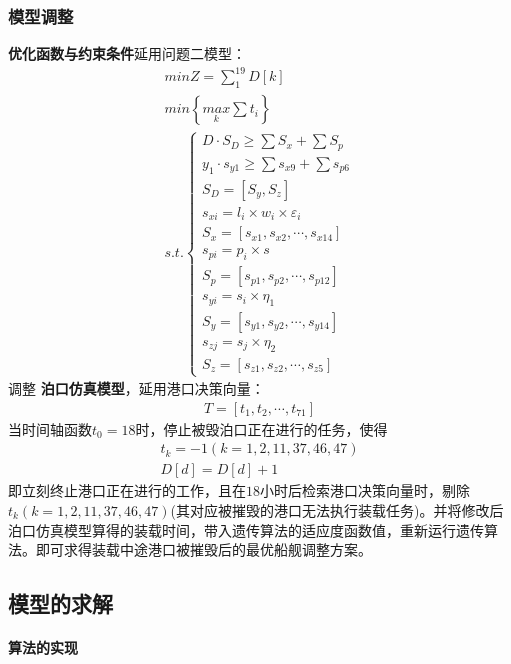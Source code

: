 \documentclass{whutmod}
\begin{document}
    \subsubsection{模型调整}
    \textbf{优化函数与约束条件}延用问题二模型：
     	\begin{gather}
     min Z=\sum _{1}^{19}D[k]\\
     min \left \{ \underset{k}{max}\sum t_{i} \right \}\\
     s.t.\left\{\begin{matrix}	 D\cdot S_{D}\geq \sum  S_{x} + \sum  S_{p}
     \\ y_{1}\cdot s_{y1}\geq \sum s_{x9}+ \sum  s_{p6}
     \\S_{D}=[S_{y}, S_{z}]
     \\ s_{xi}=l_{i}\times w_{i} \times \varepsilon _{i}
     \\S_{x}=[s_{x1},s_{x2},\cdots,s_{x14}]
     \\s_{pi}=p_{i}\times s
     \\S_{p}=[s_{p1},s_{p2},\cdots,s_{p12}]
     \\     s_{yi}=s_{i}\times \eta_{1}
     \\   S_{y}=[s_{y1},s_{y2},\cdots,s_{y14}]
     \\      s_{zj}=s_{j}\times \eta_{2}
     \\ S_{z}=[s_{z1},s_{z2},\cdots,s_{z5}]
     \end{matrix}\right. 
     \end{gather}
     调整 \textbf{泊口仿真模型}，延用港口决策向量：
     \begin{gather*}
     T=[t_{1},t_{2},\cdots,t_{71}]
     \end{gather*}
     当时间轴函数$t_{0}=18$时，停止被毁泊口正在进行的任务，使得
     \begin{gather}
     t_{k}=-1(k=1,2,11,37,46,47)\\
   	 D[d]=D[d]+1
     \end{gather}
     即立刻终止港口正在进行的工作，且在$18$小时后检索港口决策向量时，剔除$t_{k}(k=1,2,11,37,46,47)$(其对应被摧毁的港口无法执行装载任务)。并将修改后泊口仿真模型算得的装载时间，带入遗传算法的适应度函数值，重新运行遗传算法。即可求得装载中途港口被摧毁后的最优船舰调整方案。
       \subsection{模型的求解}
     \paragraph{算法的实现}
\end{document}
